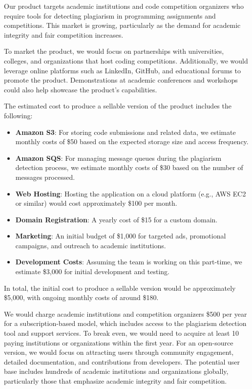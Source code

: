 \documentclass{article}
\begin{document}
Our product targets academic institutions and code competition organizers who require tools for detecting plagiarism in programming assignments and competitions. This market is growing, particularly as the demand for academic integrity and fair competition increases.

To market the product, we would focus on partnerships with universities, colleges, and organizations that host coding competitions. Additionally, we would leverage online platforms such as LinkedIn, GitHub, and educational forums to promote the product. Demonstrations at academic conferences and workshops could also help showcase the product's capabilities.

The estimated cost to produce a sellable version of the product includes the following:

\begin{itemize}
    \item \textbf{Amazon S3}: For storing code submissions and related data, we estimate monthly costs of \$50 based on the expected storage size and access frequency.
    \item \textbf{Amazon SQS}: For managing message queues during the plagiarism detection process, we estimate monthly costs of \$30 based on the number of messages processed.
    \item \textbf{Web Hosting}: Hosting the application on a cloud platform (e.g., AWS EC2 or similar) would cost approximately \$100 per month.
    \item \textbf{Domain Registration}: A yearly cost of \$15 for a custom domain.
    \item \textbf{Marketing}: An initial budget of \$1,000 for targeted ads, promotional campaigns, and outreach to academic institutions.
    \item \textbf{Development Costs}: Assuming the team is working on this part-time, we estimate \$3,000 for initial development and testing.
\end{itemize}

In total, the initial cost to produce a sellable version would be approximately \$5,000, with ongoing monthly costs of around \$180.

We would charge academic institutions and competition organizers \$500 per year for a subscription-based model, which includes access to the plagiarism detection tool and support services. To break even, we would need to acquire at least 10 paying institutions or organizations within the first year. For an open-source version, we would focus on attracting users through community engagement, detailed documentation, and contributions from developers. The potential user base includes hundreds of academic institutions and organizations globally, particularly those that emphasize academic integrity and fair competition.
\end{document}
